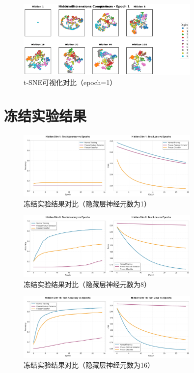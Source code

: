 \begin{figure}[H]
    \centering
    \includegraphics[width=0.8\textwidth]{../images/pa/tsne_comparison_epoch_1.png}
    \caption{t-SNE可视化对比（epoch=1）}
    \label{fig:11}
\end{figure}

\section{冻结实验结果}\label{sec:feature_extractor_classifier}
\begin{figure}[H]
    \centering
    \includegraphics[width=0.8\textwidth]{../images/dd/hidden_1_comparison.png}
    \caption{冻结实验结果对比（隐藏层神经元数为1）}
    \label{fig:hidden_1_comparison.png}
\end{figure}
\begin{figure}[H]
    \centering
    \includegraphics[width=0.8\textwidth]{../images/dd/hidden_8_comparison.png}
    \caption{冻结实验结果对比（隐藏层神经元数为8）}
    \label{fig:hidden_8_comparison.png}
\end{figure}
\begin{figure}[H]
    \centering
    \includegraphics[width=0.8\textwidth]{../images/dd/hidden_16_comparison.png}
    \caption{冻结实验结果对比（隐藏层神经元数为16）}
    \label{fig:hidden_16_comparison.png}
\end{figure}

